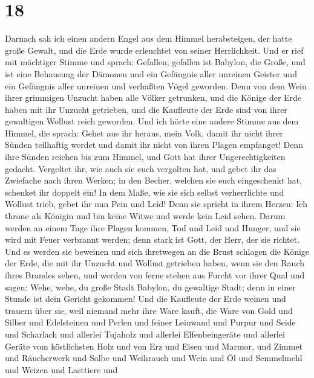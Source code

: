 \hypertarget{section-17}{%
\section{18}\label{section-17}}

 Darnach sah ich einen andern Engel aus dem Himmel
herabsteigen, der hatte große Gewalt, und die Erde wurde erleuchtet von
seiner Herrlichkeit.  Und er rief mit mächtiger Stimme und
sprach: Gefallen, gefallen ist Babylon, die Große, und ist eine
Behausung der Dämonen und ein Gefängnis aller unreinen Geister und ein
Gefängnis aller unreinen und verhaßten Vögel geworden. 
Denn von dem Wein ihrer grimmigen Unzucht haben alle Völker getrunken,
und die Könige der Erde haben mit ihr Unzucht getrieben, und die
Kaufleute der Erde sind von ihrer gewaltigen Wollust reich geworden.
 Und ich hörte eine andere Stimme aus dem Himmel, die
sprach: Gehet aus ihr heraus, mein Volk, damit ihr nicht ihrer Sünden
teilhaftig werdet und damit ihr nicht von ihren Plagen empfanget!
 Denn ihre Sünden reichen bis zum Himmel, und Gott hat
ihrer Ungerechtigkeiten gedacht.  Vergeltet ihr, wie auch
sie euch vergolten hat, und gebet ihr das Zwiefache nach ihren Werken;
in den Becher, welchen sie euch eingeschenkt hat, schenket ihr doppelt
ein!  In dem Maße, wie sie sich selbst verherrlichte und
Wollust trieb, gebet ihr nun Pein und Leid! Denn sie spricht in ihrem
Herzen: Ich throne als Königin und bin keine Witwe und werde kein Leid
sehen.  Darum werden an einem Tage ihre Plagen kommen, Tod
und Leid und Hunger, und sie wird mit Feuer verbrannt werden; denn stark
ist Gott, der Herr, der sie richtet.  Und es werden sie
beweinen und sich ihretwegen an die Brust schlagen die Könige der Erde,
die mit ihr Unzucht und Wollust getrieben haben, wenn sie den Rauch
ihres Brandes sehen,  und werden von ferne stehen aus
Furcht vor ihrer Qual und sagen: Wehe, wehe, du große Stadt Babylon, du
gewaltige Stadt; denn in einer Stunde ist dein Gericht gekommen!
 Und die Kaufleute der Erde weinen und trauern über sie,
weil niemand mehr ihre Ware kauft,  die Ware von Gold und
Silber und Edelsteinen und Perlen und feiner Leinwand und Purpur und
Seide und Scharlach und allerlei Tujaholz und allerlei Elfenbeingeräte
und allerlei Geräte vom köstlichsten Holz und von Erz und Eisen und
Marmor,  und Zimmet und Räucherwerk und Salbe und
Weihrauch und Wein und Öl und Semmelmehl und Weizen und Lasttiere und
